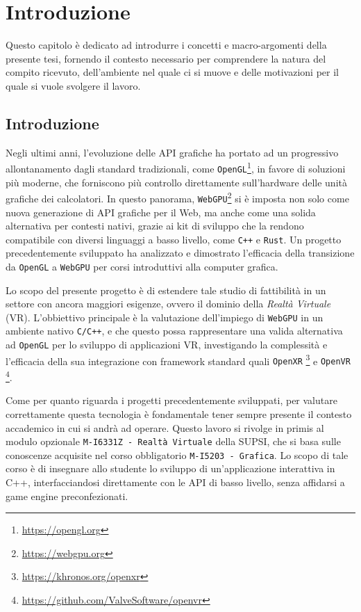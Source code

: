 \documentclass[a4paper, 11pt, twoside]{report}
\newif\ifshowlogo
\newcommand{\blankpage}{
    \clearpage
    \thispagestyle{empty}     %
    \showlogofalse            %
    \hbox{}                   %
    \newpage
    \showlogotrue             %
}
\begin{document}
\blankpage

\chapter{Introduzione}

Questo capitolo è dedicato ad introdurre i concetti e macro-argomenti della presente tesi, fornendo il contesto
necessario per comprendere la natura del compito ricevuto, dell'ambiente nel quale ci si muove e delle motivazioni
per il quale si vuole svolgere il lavoro.

\section{Introduzione}

Negli ultimi anni, l'evoluzione delle API grafiche ha portato ad un progressivo allontanamento dagli standard
tradizionali, come \texttt{OpenGL}\footnote{\url{https://opengl.org}}, in favore di soluzioni più moderne, che 
forniscono più controllo direttamente sull'hardware delle unità grafiche dei calcolatori.
In questo panorama, \texttt{WebGPU}\footnote{\url{https://webgpu.org}} si è imposta non solo come nuova generazione di
API grafiche per il Web, ma anche come una solida alternativa per contesti nativi, grazie ai kit di sviluppo che la
rendono compatibile con diversi linguaggi a basso livello, come \texttt{C++} e \texttt{Rust}.
Un progetto precedentemente sviluppato ha analizzato e dimostrato l'efficacia della transizione da \texttt{OpenGL} a
\texttt{WebGPU} per corsi introduttivi alla computer grafica.

Lo scopo del presente progetto è di estendere tale studio di fattibilità in un settore con ancora maggiori esigenze,
ovvero il dominio della \textit{Realtà Virtuale} (VR).
L'obbiettivo principale è la valutazione dell'impiego di \texttt{WebGPU} in un ambiente nativo \texttt{C/C++}, e che
questo possa rappresentare una valida alternativa ad \texttt{OpenGL} per lo sviluppo di applicazioni VR, investigando la
complessità e l'efficacia della sua integrazione con framework standard quali \texttt{\gls{OpenXR}}
\footnote{\url{https://khronos.org/openxr}} e \texttt{\gls{OpenVR}}
\footnote{\url{https://github.com/ValveSoftware/openvr}}.

Come per quanto riguarda i progetti precedentemente sviluppati, per valutare correttamente questa tecnologia è
fondamentale tener sempre presente il contesto accademico in cui si andrà ad operare. Questo lavoro si rivolge in primis
al modulo opzionale \texttt{M-I6331Z - Realtà Virtuale} della SUPSI, che si basa sulle
conoscenze acquisite nel corso obbligatorio \texttt{M-I5203 - Grafica}. Lo scopo di tale corso è di insegnare allo
studente lo sviluppo di un'applicazione interattiva in C++, interfacciandosi direttamente con le API di basso livello,
senza affidarsi a game engine preconfezionati.
\end{document}
